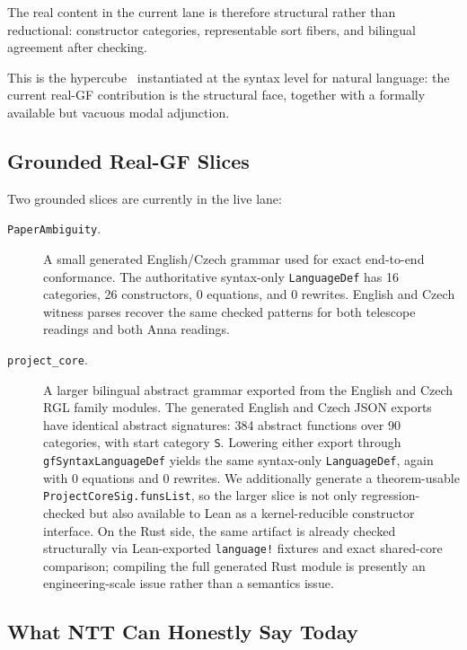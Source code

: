 \documentclass[]{article}
\newcommand{\code}[1]{\texttt{#1}}
\begin{document}
The real content in the current lane is therefore structural rather
than reductional: constructor categories, representable sort fibers,
and bilingual agreement after checking.

This is the hypercube~\cite{staymeredith2026hypercube} instantiated at
the syntax level for natural language: the current real-GF contribution
is the structural face, together with a formally available but vacuous
modal adjunction.

\subsection{Grounded Real-GF Slices}

Two grounded slices are currently in the live lane:

\begin{description}
\item[\code{PaperAmbiguity}.] A small generated English/Czech grammar used
  for exact end-to-end conformance.  The authoritative syntax-only
  \code{LanguageDef} has 16 categories, 26 constructors, 0 equations,
  and 0 rewrites.  English and Czech witness parses recover the same
  checked patterns for both telescope readings and both Anna readings.

\item[\code{project\_core}.] A larger bilingual abstract grammar exported
  from the English and Czech RGL family modules.  The generated English
  and Czech JSON exports have identical abstract signatures: 384 abstract
  functions over 90 categories, with start category \code{S}.  Lowering
  either export through \code{gfSyntaxLanguageDef} yields the same
  syntax-only \code{LanguageDef}, again with 0 equations and 0 rewrites.
  We additionally generate a theorem-usable \code{ProjectCoreSig.funsList},
  so the larger slice is not only regression-checked but also available to
  Lean as a kernel-reducible constructor interface.
  On the Rust side, the same artifact is already checked structurally via
  Lean-exported \code{language!} fixtures and exact shared-core comparison;
  compiling the full generated Rust module is presently an engineering-scale
  issue rather than a semantics issue.
\end{description}

\subsection{What NTT Can Honestly Say Today}
\end{document}
